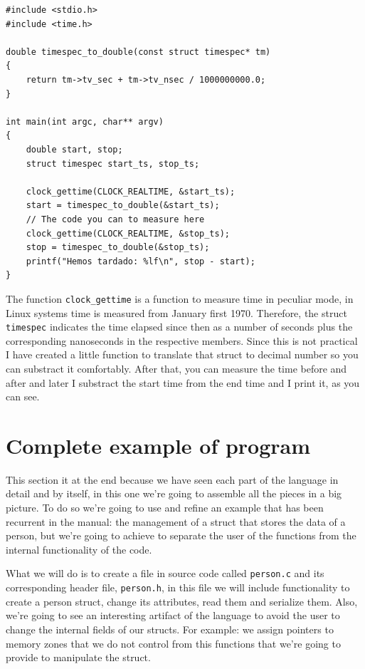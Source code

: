 \documentclass[a4paper]{article}
\begin{document}
\noindent
\begin{minipage}[H]{\linewidth}
\mbox{}
\begin{lstlisting}[style=C,
caption={How to measure time},
label={lst:measure_times}]
#include <stdio.h>
#include <time.h>

double timespec_to_double(const struct timespec* tm)
{
    return tm->tv_sec + tm->tv_nsec / 1000000000.0;
}

int main(int argc, char** argv)
{
    double start, stop;
    struct timespec start_ts, stop_ts;

    clock_gettime(CLOCK_REALTIME, &start_ts);
    start = timespec_to_double(&start_ts);
    // The code you can to measure here
    clock_gettime(CLOCK_REALTIME, &stop_ts);
    stop = timespec_to_double(&stop_ts);
    printf("Hemos tardado: %lf\n", stop - start);
}
\end{lstlisting}
\end{minipage}

The function \verb!clock_gettime! is a function to measure time in peculiar
mode, in Linux systems time is measured from January first 1970. Therefore,
the struct \verb!timespec! indicates the time elapsed since then as a number
of seconds plus the corresponding nanoseconds in the respective members. Since
this is not practical I have created a little function to translate that struct
to decimal number so you can substract it comfortably. After that, you can
measure the time before and after and later I substract the start time from the
end time and I print it, as you can see.

\section{Complete example of program}
This section it at the end because we have seen each part of the language in
detail and by itself, in this one we're going to assemble all the pieces in a
big picture. To do so we're going to use and refine an example that has been
recurrent in the manual: the management of a struct that stores the data of a
person, but we're going to achieve to separate the user of the functions from
the internal functionality of the code.

What we will do is to create a file in source code called \verb!person.c! and
its corresponding header file, \verb!person.h!, in this file we will include
functionality to create a person struct, change its attributes, read them and
serialize them. Also, we're going to see an interesting artifact of the
language to avoid the user to change the internal fields of our structs. For
example: we assign pointers to memory zones that we do not control from this
functions that we're going to provide to manipulate the struct.
\end{document}
